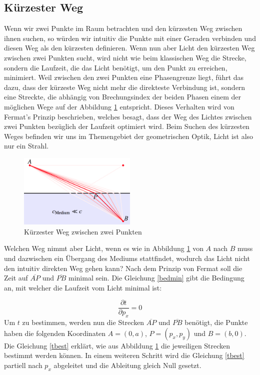 \begin{refsection}
\section{Kürzester Weg}
Wenn wir zwei Punkte im Raum betrachten und den kürzesten Weg zwischen ihnen suchen, so würden wir intuitiv die Punkte mit einer Geraden verbinden und diesen Weg als den kürzesten definieren. Wenn nun aber Licht den kürzesten Weg zwischen zwei Punkten sucht, wird nicht wie beim klassischen Weg die Strecke, sondern die Laufzeit, die das Licht benötigt, um den Punkt zu erreichen, minimiert. Weil zwischen den zwei Punkten eine Phasengrenze liegt, führt das dazu, dass der kürzeste Weg nicht mehr die direkteste Verbindung ist, sondern eine Streckte, die abhängig von Brechungsindex der beiden Phasen einem der möglichen Wege auf der Abbildung \ref{fig:weg} entspricht. Dieses Verhalten wird von Fermat's Prinzip beschrieben, welches besagt, dass der Weg des Lichtes zwischen zwei Punkten bezüglich der Laufzeit optimiert wird. Beim Suchen des kürzesten Weges befinden wir uns im Themengebiet der geometrischen Optik, Licht ist also nur ein Strahl. 
\begin{figure}
  \centering
  \includegraphics[width=0.5\textwidth]{adaptiv/images/Weg}
  \caption{Kürzester Weg zwischen zwei Punkten}
  \label{fig:weg}
\end{figure}
Welchen Weg nimmt aber Licht, wenn es wie in Abbildung \ref{fig:weg} von $A$ nach $B$ muss und dazwischen ein Übergang des Mediums stattfindet, wodurch das Licht nicht den intuitiv direkten Weg gehen kann? Nach dem Prinzip von Fermat soll die Zeit auf $\overline{AP}$ und $\overline{PB}$ minimal sein. Die Gleichung \eqref{bedmin} gibt die Bedingung an, mit welcher die Laufzeit vom Licht minimal ist:

\begin{equation}\label{bedmin}
\dfrac{\partial t}{\partial p_{x}}=0
\end{equation}
Um $t$ zu bestimmen, werden nun die Strecken $\overline{AP}$ und $\overline{PB}$ benötigt, die Punkte haben die folgenden Koordinaten $A = (0,a)$, $P=(p_{x},p_{y})$ und $B=(b,0)$. Die Gleichung \eqref{tbest} erklärt, wie aus Abbildung \ref{fig:weg} die jeweiligen Strecken bestimmt werden können. In einem weiteren Schritt wird die Gleichung \eqref{tbest} partiell nach $p_{x}$ abgeleitet und die Ableitung gleich Null gesetzt.


\end{refsection}
